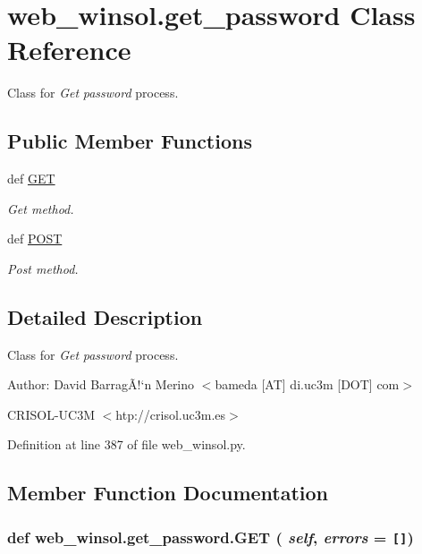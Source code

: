 \hypertarget{classweb__winsol_1_1get__password}{
\section{web\_\-winsol.get\_\-password Class Reference}
\label{classweb__winsol_1_1get__password}
}
Class for {\em Get\/} {\em password\/} process.  


\subsection*{Public Member Functions}
\begin{CompactItemize}
\item 
def \hyperlink{classweb__winsol_1_1get__password_2b8970e55f7c8d071978f49021eefa30}{GET}
\begin{CompactList}\small\item\em Get method. \item\end{CompactList}\item 
def \hyperlink{classweb__winsol_1_1get__password_83680c23995a30d5d428c8e7a7d89862}{POST}
\begin{CompactList}\small\item\em Post method. \item\end{CompactList}\end{CompactItemize}


\subsection{Detailed Description}
Class for {\em Get\/} {\em password\/} process. 

\begin{Desc}
\item[Author:]David Barrag\~{A}!`n Merino $<$bameda \mbox{[}AT\mbox{]} di.uc3m \mbox{[}DOT\mbox{]} com$>$ 

CRISOL-UC3M $<$htp://crisol.uc3m.es$>$ \end{Desc}




Definition at line 387 of file web\_\-winsol.py.

\subsection{Member Function Documentation}
\hypertarget{classweb__winsol_1_1get__password_2b8970e55f7c8d071978f49021eefa30}{
\subsubsection[GET]{\setlength{\rightskip}{0pt plus 5cm}def web\_\-winsol.get\_\-password.GET ( {\em self},  {\em errors} = {\tt \mbox{[}\mbox{]}})}}
\label{classweb__winsol_1_1get__password_2b8970e55f7c8d071978f49021eefa30}


